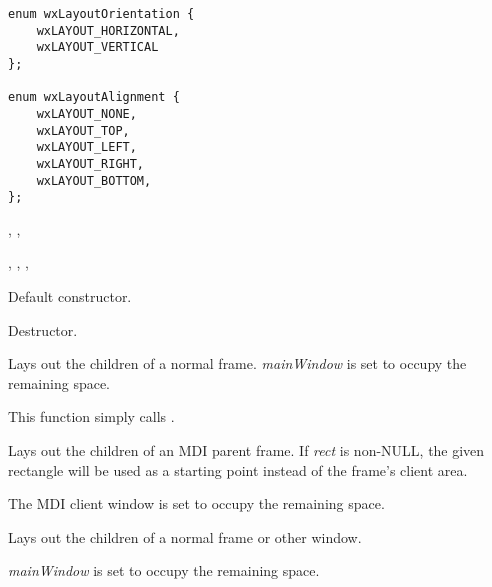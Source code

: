 
{\small
\begin{verbatim}
enum wxLayoutOrientation {
    wxLAYOUT_HORIZONTAL,
    wxLAYOUT_VERTICAL
};

enum wxLayoutAlignment {
    wxLAYOUT_NONE,
    wxLAYOUT_TOP,
    wxLAYOUT_LEFT,
    wxLAYOUT_RIGHT,
    wxLAYOUT_BOTTOM,
};
\end{verbatim}
}


, , 

,\rtfsp
{},\rtfsp
{},\rtfsp
{}




Default constructor.



Destructor.

\label{wxlayoutalgorithmlayoutframe}


Lays out the children of a normal frame. {\it mainWindow} is set to occupy the remaining space.

This function simply calls .

\label{wxlayoutalgorithmlayoutmdiframe}


Lays out the children of an MDI parent frame. If {\it rect} is non-NULL, the
given rectangle will be used as a starting point instead of the frame's client area.

The MDI client window is set to occupy the remaining space.

\label{wxlayoutalgorithmlayoutwindow}


Lays out the children of a normal frame or other window.

{\it mainWindow} is set to occupy the remaining space.

